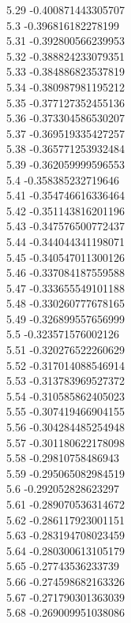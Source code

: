 {5.29	-0.400871443305707\\
5.3	-0.396816182278199\\
5.31	-0.392800566239953\\
5.32	-0.388824233079351\\
5.33	-0.384886823537819\\
5.34	-0.380987981195212\\
5.35	-0.377127352455136\\
5.36	-0.373304586530207\\
5.37	-0.369519335427257\\
5.38	-0.365771253932484\\
5.39	-0.362059999596553\\
5.4	-0.358385232719646\\
5.41	-0.354746616336464\\
5.42	-0.351143816201196\\
5.43	-0.347576500772437\\
5.44	-0.344044341198071\\
5.45	-0.340547011300126\\
5.46	-0.337084187559588\\
5.47	-0.333655549101188\\
5.48	-0.330260777678165\\
5.49	-0.326899557656999\\
5.5	-0.323571576002126\\
5.51	-0.320276522260629\\
5.52	-0.317014088546914\\
5.53	-0.313783969527372\\
5.54	-0.310585862405023\\
5.55	-0.307419466904155\\
5.56	-0.304284485254948\\
5.57	-0.301180622178098\\
5.58	-0.29810758486943\\
5.59	-0.295065082984519\\
5.6	-0.292052828623297\\
5.61	-0.289070536314672\\
5.62	-0.286117923001151\\
5.63	-0.283194708023459\\
5.64	-0.280300613105179\\
5.65	-0.27743536233739\\
5.66	-0.274598682163326\\
5.67	-0.271790301363039\\
5.68	-0.269009951038086\\
}
